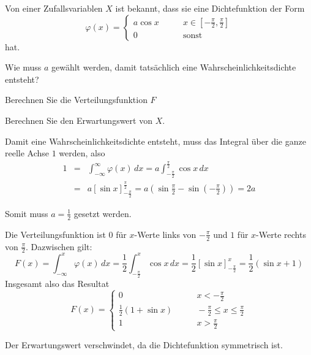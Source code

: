 Von einer Zufallsvariablen $X$ ist bekannt, dass sie eine Dichtefunktion
der Form
\[
\varphi(x)=\begin{cases}
a\cos x&\qquad x\in[-\frac{\pi}2,\frac{\pi}2]\\
0&\qquad\text{sonst}
\end{cases}
\]
hat.
\begin{teilaufgaben}
\item Wie muss $a$ gewählt werden, damit tatsächlich eine
Wahrscheinlichkeitsdichte entsteht?
\item Berechnen Sie die Verteilungsfunktion $F$
\item Berechnen Sie den Erwartungswert von $X$.
\end{teilaufgaben}

\begin{loesung}
\begin{teilaufgaben}
\item Damit eine Wahrscheinlichkeitsdichte entsteht, muss das Integral
über die ganze reelle Achse $1$ werden, also
\begin{eqnarray*}
1&=&\int_{-\infty}^\infty\varphi(x)\,dx
=a\int_{-\frac{\pi}2}^{\frac{\pi}2}\cos x\,dx\\
&=&a\left[\sin x\right]_{-\frac{\pi}2}^{\frac{\pi}2}
=a\left(\sin\frac{\pi}2 -\sin\left(-\frac{\pi}2\right)\right)
=2a
\end{eqnarray*}

Somit muss $a=\frac12$ gesetzt werden.
\item Die Verteilungsfunktion ist $0$ für $x$-Werte links von $-\frac{\pi}2$
und $1$ für $x$-Werte rechts von $\frac{\pi}2$. Dazwischen gilt:
\[
F(x)=\int_{-\infty}^x\varphi(x)\,dx
=\frac12\int_{-\frac{\pi}2}^x\cos x\,dx
=\frac12\left[\sin x\right]_{-\frac{\pi}2}^x
=\frac12(\sin x + 1)
\]
Insgesamt also das Resultat
\[
F(x)=\begin{cases}
0&\qquad x<-\frac{\pi}2\\
\frac12(1+\sin x)&\qquad -\frac{\pi}2\le x\le\frac{\pi}2\\
1&\qquad x>\frac{\pi}2
\end{cases}
\]
\item Der Erwartungswert verschwindet, da die Dichtefunktion symmetrisch ist.
\qedhere
\end{teilaufgaben}
\end{loesung}

